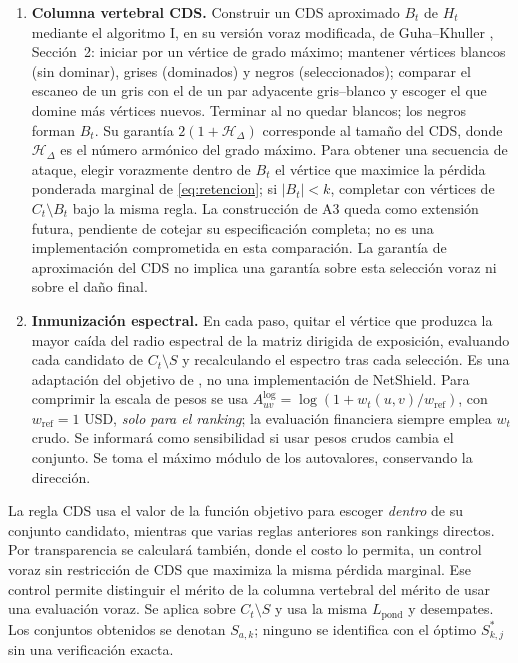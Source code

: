 \documentclass[journal]{IEEEtran}
\begin{document}
\begin{enumerate}
\item \textbf{Columna vertebral CDS.} Construir un CDS aproximado $B_t$ de
      $H_t$ mediante el algoritmo I, en su versión voraz modificada, de
      Guha--Khuller \cite{guha1998approximation}, Sección~2: iniciar por un
      vértice de grado máximo; mantener vértices blancos (sin dominar), grises
      (dominados) y negros (seleccionados); comparar el escaneo de un gris con
      el de un par adyacente gris--blanco y escoger el que domine más vértices
      nuevos. Terminar al no quedar blancos; los negros forman $B_t$.
      Su garantía $2(1+\mathcal H_\Delta)$ corresponde al tamaño del CDS,
      donde $\mathcal H_\Delta$ es el número armónico del grado máximo.
      Para obtener una secuencia de ataque,
      elegir vorazmente dentro de $B_t$ el vértice que maximice la pérdida
      ponderada marginal de \eqref{eq:retencion}; si $|B_t|<k$, completar con
      vértices de $C_t\setminus B_t$ bajo la misma regla. La construcción de A3
      queda como extensión futura, pendiente de cotejar su especificación
      completa; no es una implementación comprometida en esta comparación. La
      garantía de aproximación del CDS no implica una garantía sobre esta
      selección voraz ni sobre el daño final.

\item \textbf{Inmunización espectral.} En cada paso, quitar el vértice que
      produzca la mayor caída del radio espectral de la matriz dirigida de
      exposición, evaluando cada candidato de $C_t\setminus S$ y recalculando
      el espectro tras cada selección. Es una adaptación del objetivo de
      \cite{chen2016node}, no una implementación de NetShield. Para comprimir
      la escala de pesos se usa $A^{\log}_{uv}=\log(1+w_t(u,v)/w_{\mathrm{ref}})$,
      con $w_{\mathrm{ref}}=1$ USD, \emph{solo para el
      ranking}; la evaluación financiera siempre emplea $w_t$ crudo. Se
      informará como sensibilidad si usar pesos crudos cambia el conjunto.
      Se toma el máximo módulo de los autovalores, conservando la dirección.
\end{enumerate}

La regla CDS usa el valor de la función objetivo para escoger \emph{dentro}
de su conjunto candidato, mientras que varias reglas anteriores son rankings
directos. Por transparencia se calculará también, donde el costo lo permita,
un control voraz sin restricción de CDS que maximiza la misma pérdida marginal.
Ese control permite distinguir el mérito de la columna vertebral del mérito de
usar una evaluación voraz. Se aplica sobre $C_t\setminus S$ y usa la misma
$L_{\mathrm{pond}}$ y desempates. Los conjuntos obtenidos se denotan $S_{a,k}$;
ninguno se identifica con el óptimo $S^{\ast}_{k,j}$ sin una verificación exacta.
\end{document}
